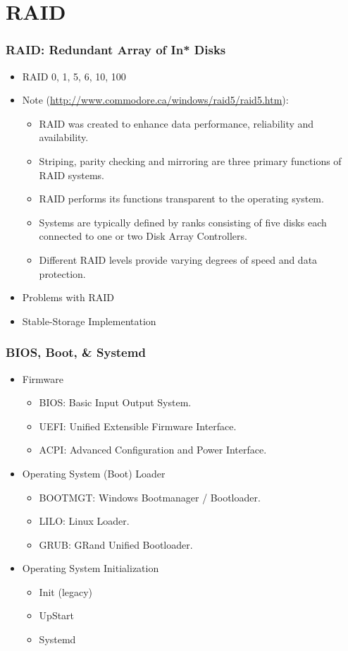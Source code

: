 \documentclass[aspectratio=169, xcolor=table, notheorems, hyperref={pdfpagelabels=false}]{beamer}
\begin{document}
\section{RAID}
\begin{frame}
\frametitle{RAID: Redundant Array of In* Disks}
\begin{itemize}
\item RAID 0, 1, 5, 6, 10, 100
\item Note (\url{http://www.commodore.ca/windows/raid5/raid5.htm}):
\begin{itemize}
\item RAID was created to enhance data performance, reliability and availability.
\item Striping, parity checking and mirroring are three primary functions of
      RAID systems.
\item RAID performs its functions transparent to the operating system.
\item Systems are typically defined by ranks consisting of five disks each
      connected to one or two Disk Array Controllers.
\item Different RAID levels provide varying degrees of speed and data protection.
\end{itemize}
\item Problems with RAID
\item Stable-Storage Implementation
\end{itemize}
\end{frame}

\begin{frame}
\frametitle{BIOS, Boot, \& Systemd}
\begin{itemize}
\item Firmware
\begin{itemize}
\item BIOS: Basic Input Output System.
\item UEFI: Unified Extensible Firmware Interface.
\item ACPI: Advanced Configuration and Power Interface.
\end{itemize}
\item Operating System (Boot) Loader
\begin{itemize}
\item BOOTMGT: Windows Bootmanager / Bootloader.
\item LILO:  Linux Loader.
\item GRUB:  GRand Unified Bootloader.
\end{itemize}
\item Operating System Initialization
\begin{itemize}
\item Init (legacy)
\item UpStart
\item Systemd
\end{itemize}
\end{itemize}
\end{frame}
\end{document}
